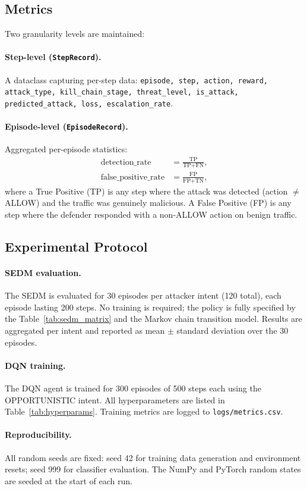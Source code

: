 \subsection{Metrics}

Two granularity levels are maintained:

\paragraph{Step-level (\texttt{StepRecord}).}
A dataclass capturing per-step data:
\texttt{episode, step, action, reward, attack\_type, kill\_chain\_stage,
threat\_level, is\_attack, predicted\_attack, loss, escalation\_rate}.

\paragraph{Episode-level (\texttt{EpisodeRecord}).}
Aggregated per-episode statistics:
%
\begin{align}
  \text{detection\_rate} &= \frac{\text{TP}}{\text{TP} + \text{FN}}, \\
  \text{false\_positive\_rate} &= \frac{\text{FP}}{\text{FP} + \text{TN}},
\end{align}
%
where a True Positive (TP) is any step where the attack was detected
(action $\neq$ ALLOW) and the traffic was genuinely malicious.
A False Positive (FP) is any step where the defender responded with a
non-ALLOW action on benign traffic.

\subsection{Experimental Protocol}

\paragraph{SEDM evaluation.}
The SEDM is evaluated for 30 episodes per attacker intent (120 total),
each episode lasting 200 steps.
No training is required; the policy is fully specified by the
Table~\ref{tab:sedm_matrix} and the Markov chain transition model.
Results are aggregated per intent and reported as mean $\pm$ standard
deviation over the 30 episodes.

\paragraph{DQN training.}
The DQN agent is trained for 300 episodes of 500 steps each using the
OPPORTUNISTIC intent.
All hyperparameters are listed in Table~\ref{tab:hyperparams}.
Training metrics are logged to \texttt{logs/metrics.csv}.

\paragraph{Reproducibility.}
All random seeds are fixed: seed 42 for training data generation and
environment resets; seed 999 for classifier evaluation.
The NumPy and PyTorch random states are seeded at the start of each run.
